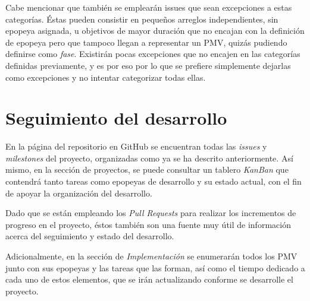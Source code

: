 Cabe mencionar que también se emplearán issues que sean excepciones a estas categorías. Éstas pueden consistir en pequeños arreglos independientes, sin epopeya asignada, u objetivos de mayor duración que no encajan con la definición de epopeya pero que tampoco llegan a representar un PMV, quizás pudiendo definirse como \textit{fase}. Existirán pocas excepciones que no encajen en las categorías definidas previamente, y es por eso por lo que se prefiere simplemente dejarlas como excepciones y no intentar categorizar todas ellas.

\section{Seguimiento del desarrollo}

En la página del repositorio en GitHub se encuentran todas las \textit{issues} y \textit{milestones} del proyecto, organizadas como ya se ha descrito anteriormente. Así mismo, en la sección de proyectos, se puede consultar un tablero \textit{KanBan} que contendrá tanto tareas como epopeyas de desarrollo y su estado actual, con el fin de apoyar la organización del desarrollo.

Dado que se están empleando los \textit{Pull Requests} para realizar los incrementos de progreso en el proyecto, éstos también son una fuente muy útil de información acerca del seguimiento y estado del desarrollo.

Adicionalmente, en la sección de \textit{Implementación} se enumerarán todos los PMV junto con sus epopeyas y las tareas que las forman, así como el tiempo dedicado a cada uno de estos elementos, que se irán actualizando conforme se desarrolle el proyecto.